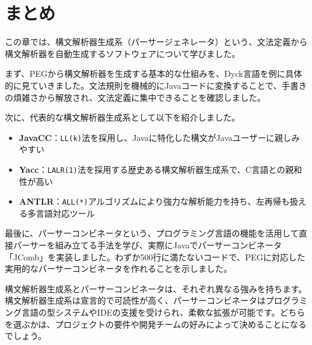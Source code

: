 \section{まとめ}

この章では、構文解析器生成系（パーサージェネレータ）という、文法定義から構文解析器を自動生成するソフトウェアについて学びました。

まず、PEGから構文解析器を生成する基本的な仕組みを、Dyck言語を例に具体的に見ていきました。文法規則を機械的にJavaコードに変換することで、手書きの煩雑さから解放され、文法定義に集中できることを確認しました。

次に、代表的な構文解析器生成系として以下を紹介しました。

\begin{itemize}
\item
  \textbf{\sffamily JavaCC}：\texttt{LL(k)}法を採用し、Javaに特化した構文がJavaユーザーに親しみやすい
\item
  \textbf{\sffamily Yacc}：\texttt{LALR(1)}法を採用する歴史ある構文解析器生成系で、C言語との親和性が高い
\item
  \textbf{\sffamily ANTLR}：\texttt{ALL(*)}アルゴリズムにより強力な解析能力を持ち、左再帰も扱える多言語対応ツール
\end{itemize}

最後に、パーサーコンビネータという、プログラミング言語の機能を活用して直接パーサーを組み立てる手法を学び、実際にJavaでパーサーコンビネータ「JComb」を実装しました。わずか500行に満たないコードで、PEGに対応した実用的なパーサーコンビネータを作れることを示しました。

構文解析器生成系とパーサーコンビネータは、それぞれ異なる強みを持ちます。構文解析器生成系は宣言的で可読性が高く、パーサーコンビネータはプログラミング言語の型システムやIDEの支援を受けられ、柔軟な拡張が可能です。どちらを選ぶかは、プロジェクトの要件や開発チームの好みによって決めることになるでしょう。
